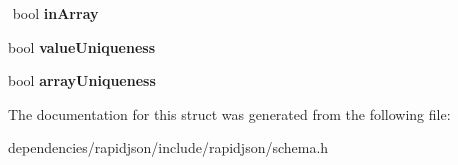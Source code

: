 \begin{DoxyCompactItemize}
$$\mbox{\label{structinternal_1_1_schema_validation_context_af18fc4ef754e8a52732e152854f06341}} 
bool {\bfseries in\+Array}
\item 
\mbox{\label{structinternal_1_1_schema_validation_context_a23e93ca88653ed878e3ddf290fc6bd9f}} 
bool {\bfseries value\+Uniqueness}
\item 
\mbox{\label{structinternal_1_1_schema_validation_context_a0864c5e8155fe0064f17e8dcb31d93c7}} 
bool {\bfseries array\+Uniqueness}
\end{DoxyCompactItemize}


The documentation for this struct was generated from the following file\+:\begin{DoxyCompactItemize}
\item 
dependencies/rapidjson/include/rapidjson/schema.\+h\end{DoxyCompactItemize}
